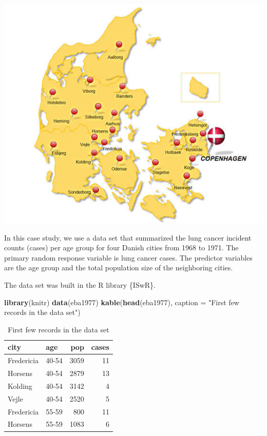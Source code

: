 \documentclass[
]{book}
\newenvironment{Shaded}{\begin{snugshade}}{\end{snugshade}}
\newcommand{\AttributeTok}[1]{\textcolor[rgb]{0.13,0.29,0.53}{#1}}
\newcommand{\FunctionTok}[1]{\textcolor[rgb]{0.13,0.29,0.53}{\textbf{#1}}}
\newcommand{\NormalTok}[1]{#1}
\newcommand{\StringTok}[1]{\textcolor[rgb]{0.31,0.60,0.02}{#1}}
\begin{document}
\begin{center}\includegraphics[width=0.6\linewidth]{img10/DenmarkCitiesMap} \end{center}

In this case study, we use a data set that summarized the lung cancer incident counts (cases) per age group for four Danish cities from 1968 to 1971. The primary random response variable is lung cancer cases. The predictor variables are the age group and the total population size of the neighboring cities.

The data set was built in the R library \{ISwR\}.

\begin{Shaded}
\begin{Highlighting}[]
\FunctionTok{library}\NormalTok{(knitr)}
\FunctionTok{data}\NormalTok{(eba1977)}
\FunctionTok{kable}\NormalTok{(}\FunctionTok{head}\NormalTok{(eba1977), }\AttributeTok{caption =} \StringTok{"First few records in the data set"}\NormalTok{) }
\end{Highlighting}
\end{Shaded}

\begin{table}

\caption{\label{tab:unnamed-chunk-157}First few records in the data set}
\centering
\begin{tabular}[t]{l|l|r|r}
\hline
city & age & pop & cases\\
\hline
Fredericia & 40-54 & 3059 & 11\\
\hline
Horsens & 40-54 & 2879 & 13\\
\hline
Kolding & 40-54 & 3142 & 4\\
\hline
Vejle & 40-54 & 2520 & 5\\
\hline
Fredericia & 55-59 & 800 & 11\\
\hline
Horsens & 55-59 & 1083 & 6\\
\hline
\end{tabular}
\end{table}
\end{document}
